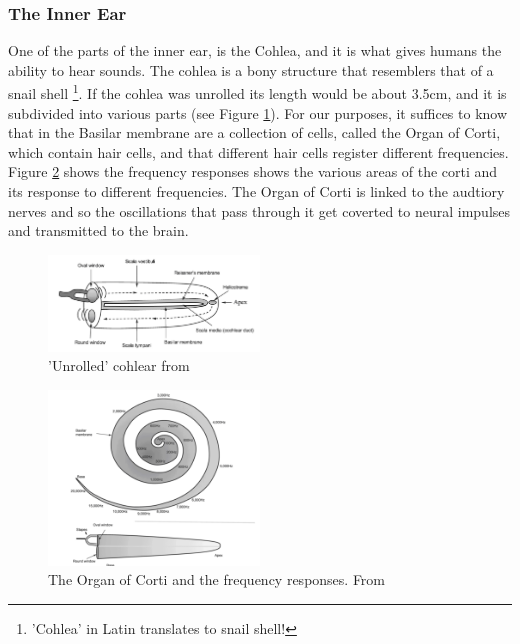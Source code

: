 \documentclass[logo,bsc,singlespacing,parskip,online]{infthesis}
\begin{document}
\subsubsection{The Inner Ear}
One of the parts of the inner ear, is the Cohlea, and it is what gives humans the ability to hear sounds.
The cohlea is a bony structure that resemblers that of a snail shell \footnote{'Cohlea' in Latin translates to snail shell!}.
If the cohlea was unrolled its length would be about 3.5cm, and it is subdivided into various parts (see Figure \ref{fig:cohlear}).
For our purposes, it suffices to know that in the Basilar membrane are a collection of cells, called 
the Organ of Corti, which contain hair cells, and that different hair cells register different frequencies.
Figure \ref{fig:corti} shows the frequency responses shows the various areas of the corti 
and its response to different frequencies. The Organ of Corti is linked to the audtiory nerves and 
so the oscillations that pass through it get coverted to neural impulses and transmitted to the brain.


\begin{figure}[h]
   \centering
   \includegraphics[width=0.5\textwidth]{wayland-cohlear.png}
   \caption{'Unrolled' cohlear from \citet{Wayland2018Phonetics}}
   \label{fig:cohlear}
\end{figure}

\begin{figure}[h]
   \centering
   \includegraphics[width=0.5\textwidth]{wayland-corti.png}
   \caption{The Organ of Corti and the frequency responses. From \citet{Wayland2018Phonetics}}
   \label{fig:corti}
\end{figure}
\end{document}
